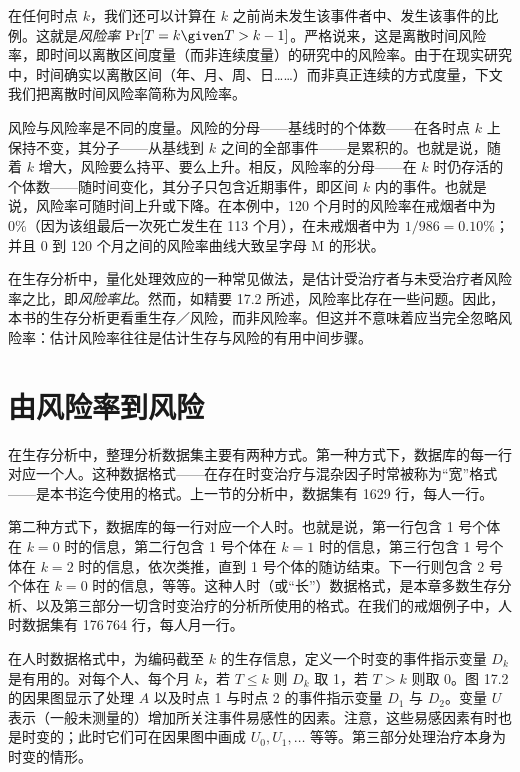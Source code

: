 在任何时点 $k$，我们还可以计算在 $k$ 之前尚未发生该事件者中、发生该事件的比例。这就是\emph{风险率} $\Pr[T=k\given T>k-1]$。严格说来，这是离散时间风险率，即时间以离散区间度量（而非连续度量）的研究中的风险率。由于在现实研究中，时间确实以离散区间（年、月、周、日……）而非真正连续的方式度量，下文我们把离散时间风险率简称为风险率。

风险与风险率是不同的度量。风险的分母——基线时的个体数——在各时点 $k$ 上保持不变，其分子——从基线到 $k$ 之间的全部事件——是累积的。也就是说，随着 $k$ 增大，风险要么持平、要么上升。相反，风险率的分母——在 $k$ 时仍存活的个体数——随时间变化，其分子只包含近期事件，即区间 $k$ 内的事件。也就是说，风险率可随时间上升或下降。在本例中，120 个月时的风险率在戒烟者中为 0\%（因为该组最后一次死亡发生在 113 个月），在未戒烟者中为 $1/986=0.10\%$；并且 0 到 120 个月之间的风险率曲线大致呈字母 M 的形状。

在生存分析中，量化处理效应的一种常见做法，是估计受治疗者与未受治疗者风险率之比，即\emph{风险率比}。然而，如精要 17.2 所述，风险率比存在一些问题。因此，本书的生存分析更看重生存／风险，而非风险率。但这并不意味着应当完全忽略风险率：估计风险率往往是估计生存与风险的有用中间步骤。

\section{由风险率到风险}

在生存分析中，整理分析数据集主要有两种方式。第一种方式下，数据库的每一行对应一个人。这种数据格式——在存在时变治疗与混杂因子时常被称为“宽”格式——是本书迄今使用的格式。上一节的分析中，数据集有 1629 行，每人一行。

第二种方式下，数据库的每一行对应一个人时。也就是说，第一行包含 1 号个体在 $k=0$ 时的信息，第二行包含 1 号个体在 $k=1$ 时的信息，第三行包含 1 号个体在 $k=2$ 时的信息，依次类推，直到 1 号个体的随访结束。下一行则包含 2 号个体在 $k=0$ 时的信息，等等。这种人时（或“长”）数据格式，是本章多数生存分析、以及第三部分一切含时变治疗的分析所使用的格式。在我们的戒烟例子中，人时数据集有 176\,764 行，每人月一行。

在人时数据格式中，为编码截至 $k$ 的生存信息，定义一个时变的事件指示变量 $D_k$ 是有用的。对每个人、每个月 $k$，若 $T\le k$ 则 $D_k$ 取 1，若 $T>k$ 则取 0。图 17.2 的因果图显示了处理 $A$ 以及时点 1 与时点 2 的事件指示变量 $D_1$ 与 $D_2$。变量 $U$ 表示（一般未测量的）增加所关注事件易感性的因素。注意，这些易感因素有时也是时变的；此时它们可在因果图中画成 $U_0,U_1,\dots$ 等等。第三部分处理治疗本身为时变的情形。

